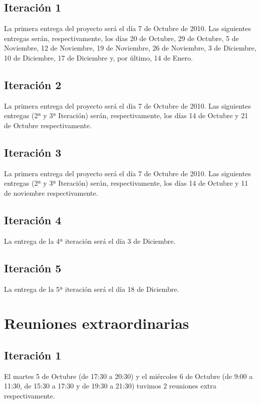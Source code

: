 \documentclass[11 pt]{book}
\begin{document}
        \subsection*{Iteración 1}
            La primera entrega del proyecto será el día 7 de Octubre de 2010. Las siguientes entregas serán, respectivamente, los días 20 de Octubre, 29 de Octubre, 5 de Noviembre, 12 de Noviembre, 19 de Noviembre, 26 de Noviembre, 3 de Diciembre, 10 de Diciembre, 17 de Diciembre y, por último, 14 de Enero.
            
        \subsection*{Iteración 2}
            La primera entrega del proyecto será el día 7 de Octubre de 2010. Las siguientes entregas (2ª y 3ª Iteración) serán, respectivamente, los días 14 de Octubre y 21 de Octubre respectivamente.
            
        \subsection*{Iteración 3}
	        La primera entrega del proyecto será el día 7 de Octubre de 2010. Las siguientes entregas (2ª y 3ª Iteración) serán, respectivamente, los días 14 de Octubre y 11 de noviembre respectivamente.

		\subsection*{Iteración 4}
			La entrega de la 4ª iteración será el día 3 de Diciembre.
			
		\subsection*{Iteración 5}
			La entrega de la 5ª iteración será el día 18 de Diciembre.
			
	\section{Reuniones extraordinarias}
	    \subsection*{Iteración 1}
		    El martes 5 de Octubre (de 17:30 a 20:30) y el miércoles 6 de Octubre (de 9:00 a 11:30, de 15:30 a 17:30 y de 19:30 a 21:30) tuvimos 2 reuniones extra respectivamente.
\end{document}
